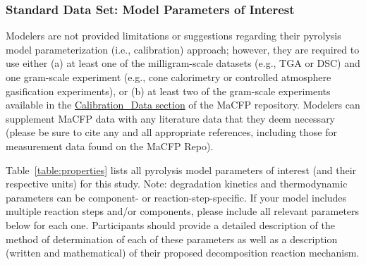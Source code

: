 \documentclass[12pt]{article}
\begin{document}
\subsubsection{Standard Data Set: Model Parameters of Interest}
Modelers are not provided limitations or suggestions regarding their pyrolysis model parameterization (i.e., calibration) approach; however, they are required to use either (a) at least one of the milligram-scale datasets (e.g., TGA or DSC) and one gram-scale experiment (e.g., cone calorimetry or controlled atmosphere gasification experiments), or (b) at least two of the gram-scale experiments available in the \href{https://github.com/MaCFP/matl-db/tree/master/Wood/Calibration_Data}{Calibration\_Data section} of the MaCFP repository. Modelers can supplement MaCFP data with any literature data that they deem necessary (please be sure to cite any and all appropriate references, including those for measurement data found on the MaCFP Repo).

Table~\ref{table:properties} lists all pyrolysis model parameters of interest (and their respective units) for this study. Note: degradation kinetics and thermodynamic parameters can be component- or reaction-step-specific. If your model includes multiple reaction steps and/or components, please include all relevant parameters below for each one. Participants should provide a detailed description of the method of determination of each of these parameters as well as a description (written and mathematical) of their proposed decomposition reaction mechanism. 
\end{document}
